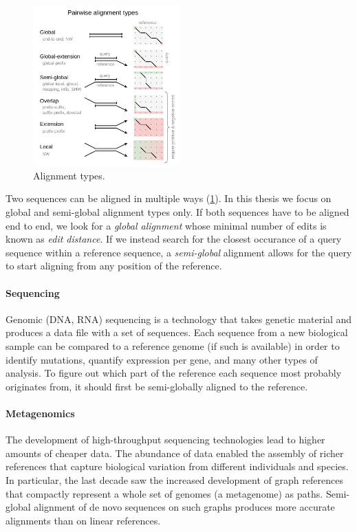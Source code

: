 \begin{figure}[t]  %
    \includegraphics[width=0.5\textwidth]{alignment-types}
	\caption[Alignment types]{Alignment types.}
    \label{fig:alignment-types}
\end{figure}
Two sequences can be aligned in multiple ways (\cref{fig:alignment-types}). In
this thesis we focus on global and semi-global alignment types only. If both
sequences have to be aligned end to end, we look for a \emph{global alignment}
whose minimal number of edits is known as \emph{edit distance}. If we instead
search for the closest occurance of a query sequence within a reference
sequence, a \emph{semi-global} alignment allows for the query to start aligning
from any position of the reference.

\paragraph{Sequencing}
Genomic (DNA, RNA) sequencing is a technology that takes genetic material and
produces a data file with a set of sequences. Each sequence from a new
biological sample can be compared to a reference genome (if such is available)
in order to identify mutations, quantify expression per gene, and many other
types of analysis. To figure out which part of the reference each sequence most
probably originates from, it should first be semi-globally aligned to the
reference.

\paragraph{Metagenomics}
The development of high-throughput sequencing technologies lead to higher
amounts of cheaper data. The abundance of data enabled the assembly of richer
references that capture biological variation from different individuals and
species. In particular, the last decade saw the increased development of graph
references that compactly represent a whole set of genomes (a metagenome) as
paths. Semi-global alignment of de novo sequences on such graphs produces more
accurate alignments than on linear references.


